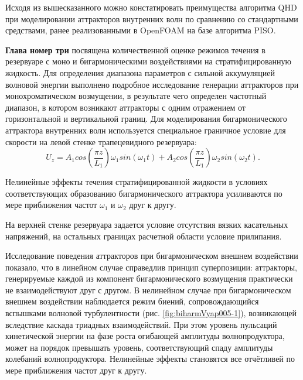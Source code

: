 \documentclass[utf8x]{G7-32} %
\begin{document}
Исходя из вышесказанного можно констатировать преимущества алгоритма QHD при моделировании аттракторов внутренних волн по сравнению со стандартными средствами, ранее реализованными в OpenFOAM на базе алгоритма PISO. 


\textbf{Глава номер три} посвящена количественной оценке режимов течения в резервуаре с моно и бигармоническими воздействиями на стратифицированную жидкость. Для определения диапазона параметров с сильной аккумуляцией волновой энергии выполнено подробное исследование генерации аттракторов при монохроматическом возмущении, в результате чего определен частотный диапазон, в котором возникают аттракторы с одним отражением от горизонтальной и вертикальной границ. Для моделирования бигармонического аттрактора внутренних волн используется специальное граничное условие для скорости на левой стенке трапецевидного резервуара:
$$U_z = A_1 cos\left(\frac{\pi z}{L_1}\right) \omega_1   sin(\omega_1 t) + A_2 cos\left(\frac{\pi z}{L_1}\right) \omega_2  sin(\omega_2 t).$$

Нелинейные эффекты течения стратифицированной жидкости в условиях соответствующих образованию бигармонического аттрактора усиливаются по мере приближения частот $\omega_1$ и $\omega_2$ друг к другу. 

На верхней стенке резервуара задается условие отсутствия вязких касательных напряжений, на остальных границах расчетной области условие прилипания. 

Исследование поведения аттракторов при бигармоническом внешнем воздействии показало, что в линейном случае справедлив принцип суперпозиции: аттракторы, генерируемые каждой из компонент бигармонического возмущения практически не взаимодействуют друг с другом. В нелинейном случае при бигармоническом внешнем воздействии наблюдается режим биений, сопровождающийся вспышками волновой турбулентности (рис. \ref{fig:biharmVyap005-1}), возникающей вследствие каскада триадных взаимодействий. При этом уровень пульсаций кинетической энергии на фазе роста огибающей амплитуды волнопродуктора, может на порядок превышать уровень, соответствующий спаду амплитуды колебаний волнопродуктора. Нелинейные эффекты становятся все отчётливей по мере приближения частот друг к другу. 
\end{document}
